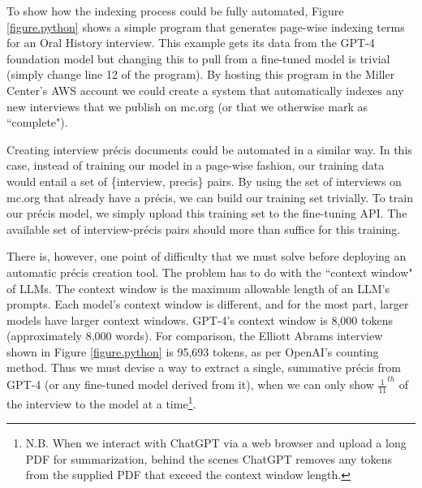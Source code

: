 \documentclass[12pt, oneside]{article}   	%
\begin{document}
To show how the indexing process could be fully automated, Figure \ref{figure.python} shows a simple program that generates page-wise indexing terms for an Oral History interview.  This example gets its data from the GPT-4 foundation model but changing this to pull from a fine-tuned model is trivial (simply change line 12 of the program).  By hosting this program in the Miller Center's AWS account we could create a system that automatically indexes any new interviews that we publish on mc.org (or that we otherwise mark as ``complete").

Creating interview pr\'{e}cis documents could be automated in a similar way.  In this case, instead of training our model in a page-wise fashion, our training data would entail a set of \{interview, precis\} pairs.  By using the set of interviews on mc.org that already have a pr\'{e}cis, we can build our training set trivially.  To train our pr\'{e}cis model, we simply upload this training set to the fine-tuning API.  The available set of interview-pr\'{e}cis pairs should more than suffice for this training.

There is, however, one point of difficulty that we must solve before deploying an automatic pr\'{e}cis creation tool.  The problem has to do with the ``context window" of LLMs.  The context window is  the maximum allowable length of an LLM's prompts.  Each model's context window is different, and for the most part, larger models have larger context windows.  GPT-4's context window is 8,000 tokens (approximately 8,000 words).  For comparison, the Elliott Abrams interview shown in Figure \ref{figure.python} is 95,693 tokens, as per OpenAI's counting method.  Thus we must devise a way to extract a single, summative pr\'{e}cis from GPT-4 (or any fine-tuned model derived from it), when we can only show $\frac{1}{11}^{th}$ of the interview to the model at a time\footnote{N.B. When we interact with ChatGPT via a web browser and upload a long PDF for summarization, behind the scenes ChatGPT removes any tokens from the supplied PDF that exceed the context window length.}.
\end{document}

